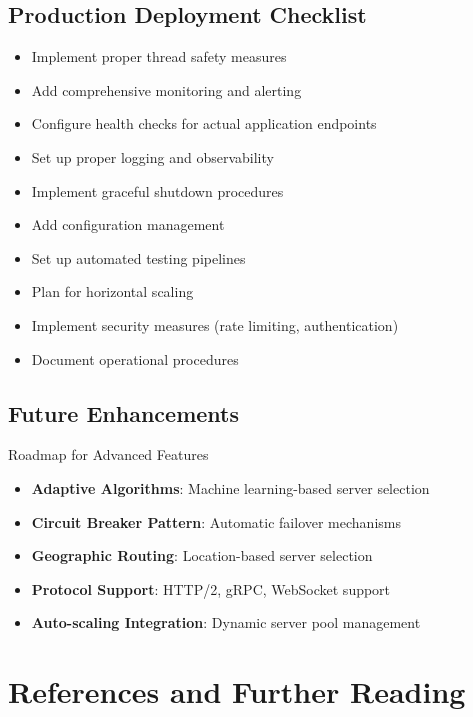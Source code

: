 \documentclass[12pt,a4paper]{article}
\begin{document}
\subsection{Production Deployment Checklist}

\begin{itemize}[label=\checkmark]
    \item Implement proper thread safety measures
    \item Add comprehensive monitoring and alerting
    \item Configure health checks for actual application endpoints
    \item Set up proper logging and observability
    \item Implement graceful shutdown procedures
    \item Add configuration management
    \item Set up automated testing pipelines
    \item Plan for horizontal scaling
    \item Implement security measures (rate limiting, authentication)
    \item Document operational procedures
\end{itemize}

\subsection{Future Enhancements}

\begin{infobox}{Roadmap for Advanced Features}
\begin{itemize}
    \item \textbf{Adaptive Algorithms}: Machine learning-based server selection
    \item \textbf{Circuit Breaker Pattern}: Automatic failover mechanisms
    \item \textbf{Geographic Routing}: Location-based server selection
    \item \textbf{Protocol Support}: HTTP/2, gRPC, WebSocket support
    \item \textbf{Auto-scaling Integration}: Dynamic server pool management
\end{itemize}
\end{infobox}

\section{References and Further Reading}
\end{document}
